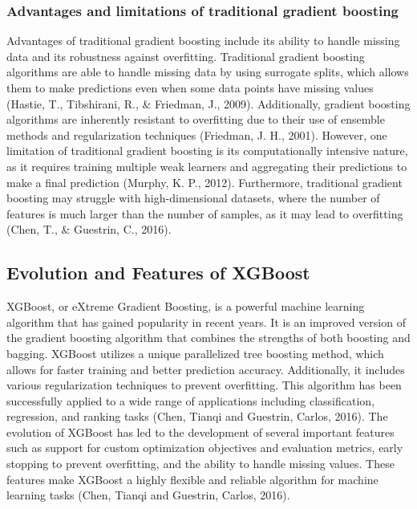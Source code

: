 \documentclass[12pt,oneside]{report}
\begin{document}
\subsubsection{Advantages and limitations of traditional gradient boosting}
Advantages of traditional gradient boosting include its ability to handle missing data and its robustness against overfitting. Traditional gradient boosting algorithms are able to handle missing data by using surrogate splits, which allows them to make predictions even when some data points have missing values (Hastie, T., Tibshirani, R., \& Friedman, J., 2009). Additionally, gradient boosting algorithms are inherently resistant to overfitting due to their use of ensemble methods and regularization techniques (Friedman, J. H., 2001). However, one limitation of traditional gradient boosting is its computationally intensive nature, as it requires training multiple weak learners and aggregating their predictions to make a final prediction (Murphy, K. P., 2012). Furthermore, traditional gradient boosting may struggle with high-dimensional datasets, where the number of features is much larger than the number of samples, as it may lead to overfitting (Chen, T., \& Guestrin, C., 2016).

\subsection{Evolution and Features of XGBoost}
XGBoost, or eXtreme Gradient Boosting, is a powerful machine learning algorithm that has gained popularity in recent years. It is an improved version of the gradient boosting algorithm that combines the strengths of both boosting and bagging. XGBoost utilizes a unique parallelized tree boosting method, which allows for faster training and better prediction accuracy. Additionally, it includes various regularization techniques to prevent overfitting. This algorithm has been successfully applied to a wide range of applications including classification, regression, and ranking tasks (Chen, Tianqi and Guestrin, Carlos, 2016). The evolution of XGBoost has led to the development of several important features such as support for custom optimization objectives and evaluation metrics, early stopping to prevent overfitting, and the ability to handle missing values. These features make XGBoost a highly flexible and reliable algorithm for machine learning tasks (Chen, Tianqi and Guestrin, Carlos, 2016).
\end{document}
